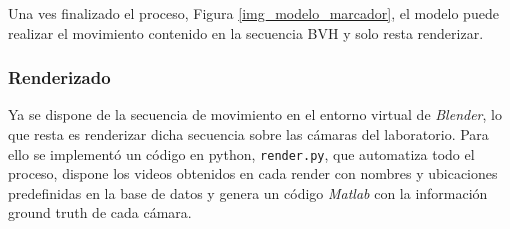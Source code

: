 Una ves finalizado el proceso, Figura \ref{img_modelo_marcador},  el modelo puede realizar el movimiento contenido en la secuencia BVH y solo resta renderizar. 

\subsubsection*{Renderizado} 

Ya se dispone de la secuencia de movimiento en el entorno virtual de \textit{Blender}, lo que resta es renderizar dicha secuencia sobre las cámaras del laboratorio. Para ello se implementó un código en python, \texttt{render.py},  que automatiza todo el proceso, dispone los videos obtenidos en cada render con nombres y ubicaciones predefinidas en la base de datos y genera un código \textit{Matlab} con la información ground truth de cada cámara. 


